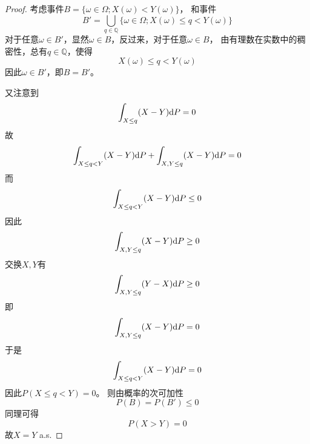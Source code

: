 \documentclass[cn]{homework}
\begin{document}
\begin{subproblem}
\begin{proof}
            考虑事件$B=\{\omega\in\Omega;X(\omega)<Y(\omega)\}$，
            和事件
            \[B'=\bigcup_{q\in\mathbb Q}\{\omega\in\Omega;X(\omega)\leq q<Y(\omega)\}\]
            对于任意$\omega\in B'$，显然$\omega\in B$，反过来，对于任意$\omega\in B$，
            由有理数在实数中的稠密性，总有$q\in\mathbb Q$，使得
            \[X(\omega)\leq q<Y(\omega)\]
            因此$\omega\in B'$，即$B=B'$。

            又注意到
            \[\int_{X\leq q}(X-Y)\mathrm d P=0\]
            故
            \[\int_{X\leq q<Y}(X-Y)\mathrm d P+\int_{X,Y\leq q}(X-Y)\mathrm d P=0\]
            而
            \[\int_{X\leq q<Y}(X-Y)\mathrm d P\leq 0\]
            因此
            \[\int_{X,Y\leq q}(X-Y)\mathrm d P\geq 0\]
            交换$X,Y$有
            \[\int_{X,Y\leq q}(Y-X)\mathrm d P\geq 0\]
            即
            \[\int_{X,Y\leq q}(X-Y)\mathrm d P=0\]
            于是
            \[\int_{X\leq q<Y}(X-Y)\mathrm d P=0\]
            因此$P(X\leq q<Y)=0$。
            则由概率的次可加性
            \[P(B)=P(B')\leq 0\]
            同理可得
            \[P(X>Y)=0\]
            故$X=Y$ a.s.
        \end{proof}
    \end{subproblem}
\end{document}
